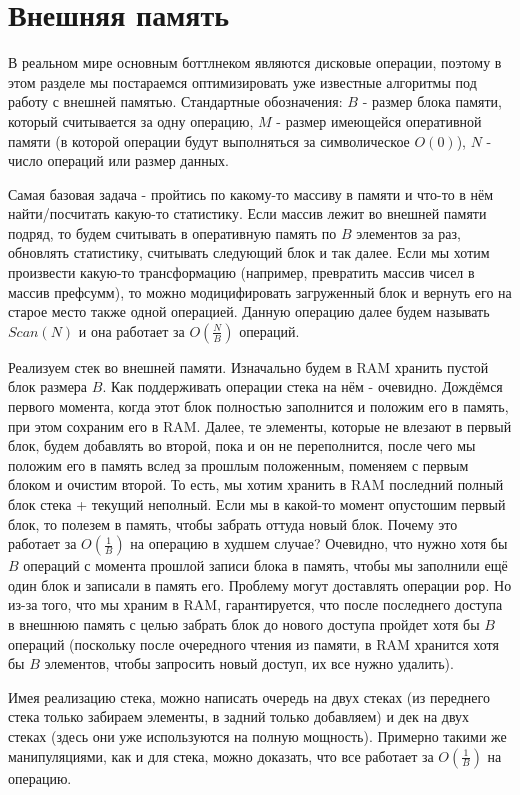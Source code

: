 \section{Внешняя память}

В реальном мире основным боттлнеком являются дисковые операции, поэтому в этом разделе мы постараемся оптимизировать уже известные алгоритмы под работу с внешней памятью. Стандартные обозначения: $B$ - размер блока памяти, который считывается за одну операцию, $M$ - размер имеющейся оперативной памяти (в которой операции будут выполняться за символическое $O(0)$), $N$ - число операций или размер данных.

Самая базовая задача - пройтись по какому-то массиву в памяти и что-то в нём найти/посчитать какую-то статистику. Если массив лежит во внешней памяти подряд, то будем считывать в оперативную память по $B$ элементов за раз, обновлять статистику, считывать следующий блок и так далее. Если мы хотим произвести какую-то трансформацию (например, превратить массив чисел в массив префсумм), то можно модицифировать загруженный блок и вернуть его на старое место также одной операцией. Данную операцию далее будем называть $Scan(N)$ и она работает за $O(\frac{N}{B})$ операций.

Реализуем стек во внешней памяти. Изначально будем в RAM хранить пустой блок размера $B$. Как поддерживать операции стека на нём - очевидно. Дождёмся первого момента, когда этот блок полностью заполнится и положим его в память, при этом сохраним его в RAM. Далее, те элементы, которые не влезают в первый блок, будем добавлять во второй, пока и он не переполнится, после чего мы положим его в память вслед за прошлым положенным, поменяем с первым блоком и очистим второй. То есть, мы хотим хранить в RAM последний полный блок стека + текущий неполный. Если мы в какой-то момент опустошим первый блок, то полезем в память, чтобы забрать оттуда новый блок. Почему это работает за $O(\frac{1}{B})$ на операцию в худшем случае? Очевидно, что нужно хотя бы $B$ операций с момента прошлой записи блока в память, чтобы мы заполнили ещё один блок и записали в память его. Проблему могут доставлять операции \texttt{pop}. Но из-за того, что мы храним в RAM, гарантируется, что после последнего доступа в внешнюю память с целью забрать блок до нового доступа пройдет хотя бы $B$ операций (поскольку после очередного чтения из памяти, в RAM хранится хотя бы $B$ элементов, чтобы запросить новый доступ, их все нужно удалить).

Имея реализацию стека, можно написать очередь на двух стеках (из переднего стека только забираем элементы, в задний только добавляем) и дек на двух стеках (здесь они уже используются на полную мощность). Примерно такими же манипуляциями, как и для стека, можно доказать, что все работает за $O(\frac{1}{B})$ на операцию.

